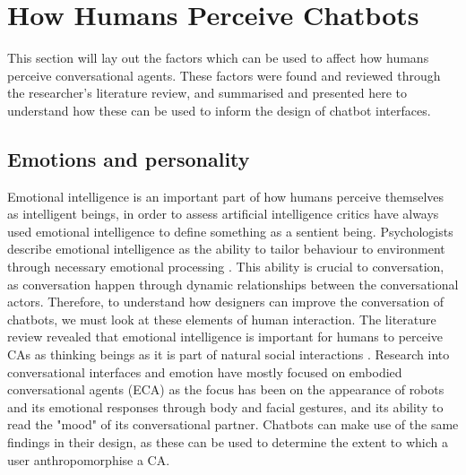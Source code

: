 \section{How Humans Perceive Chatbots}

This section will lay out the factors which can be used to affect how humans perceive conversational agents. These factors were found and reviewed through the researcher's literature review, and summarised and presented here to understand how these can be used to inform the design of chatbot interfaces.

\subsection{Emotions and personality}
Emotional intelligence is an important part of how humans perceive themselves as intelligent beings, in order to assess artificial intelligence critics have always used emotional intelligence to define something as a sentient being. Psychologists describe emotional intelligence as the ability to tailor behaviour to environment through necessary emotional processing \citep{callejas2011}. This ability is crucial to conversation, as conversation happen through dynamic relationships between the conversational actors. Therefore, to understand how designers can improve the conversation of chatbots, we must look at these elements of human interaction. The literature review revealed that emotional intelligence is important for humans to perceive CAs as thinking beings as it is part of natural social interactions \citep{Griol2015a,Griol2017,Balzarotti2014,Lemon2012,Mencia2012,McTear2016a}. Research into conversational interfaces and emotion have mostly focused on embodied conversational agents (ECA) \citep{Lester1997,Stern2003, Beun2003,Reeves1996} as the focus has been on the appearance of robots and its emotional responses through body and facial gestures, and its ability to read the "mood" of its conversational partner. Chatbots can make use of the same findings in their design, as these can be used to determine the extent to which a user anthropomorphise a CA.

